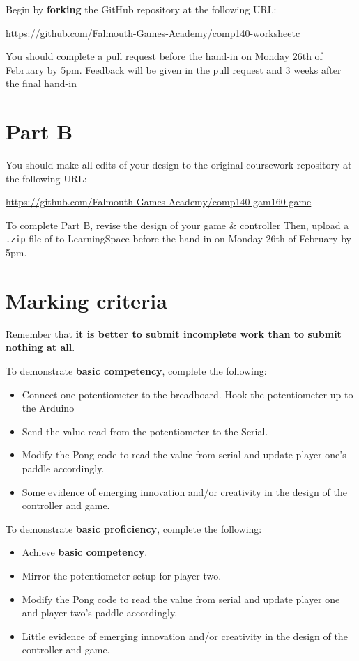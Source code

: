 \documentclass{../../../fal_assignment}
\begin{document}

Begin by \textbf{forking} the GitHub repository at the following URL:

\url{https://github.com/Falmouth-Games-Academy/comp140-worksheetc}

You should complete a pull request before the hand-in on Monday 26th of February by 5pm. Feedback will be given in the pull request and 3 weeks after the final hand-in

\section*{Part B}

You should make all edits of your design to the original coursework repository at the following URL:

\url{https://github.com/Falmouth-Games-Academy/comp140-gam160-game} 

To complete Part B, revise the design of your game \& controller Then, upload a \texttt{.zip} file of to LearningSpace before the hand-in on Monday 26th of February by 5pm.

\section*{Marking criteria}

Remember that \textbf{it is better to submit incomplete work than to submit nothing at all}. 

To demonstrate \textbf{basic competency}, complete the following:
\begin{itemize}
	\item Connect one potentiometer to the breadboard. Hook the potentiometer up to the Arduino
	\item Send the value read from the potentiometer to the Serial.
	\item Modify the Pong code to read the value from serial and update player one's paddle accordingly.
	\item Some evidence of emerging innovation and/or creativity in the design of the controller and game.
\end{itemize} 

To demonstrate \textbf{basic proficiency}, complete the following:
\begin{itemize}
	\item Achieve \textbf{basic competency}.
	\item Mirror the potentiometer setup for player two.
	\item Modify the Pong code to read the value from serial and update player one and player two's paddle accordingly.
	\item Little evidence of emerging innovation and/or creativity in the design of the controller and game.
\end{itemize}
\end{document}
